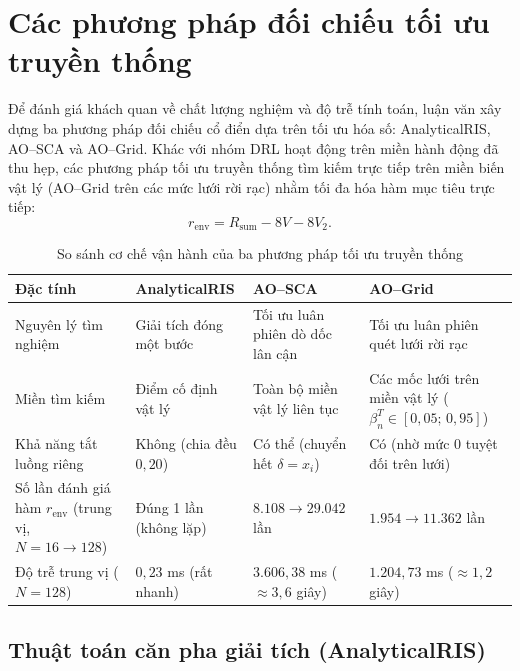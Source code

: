 

\section{Các phương pháp đối chiếu tối ưu truyền thống}
\label{sec:doi-chieu-ao}

Để đánh giá khách quan về chất lượng nghiệm và độ trễ tính toán, luận văn xây dựng ba phương pháp đối chiếu cổ
điển dựa trên tối ưu hóa số: AnalyticalRIS, AO--SCA và AO--Grid. Khác với nhóm DRL hoạt động trên miền hành động
đã thu hẹp, các phương pháp tối ưu truyền thống tìm kiếm trực tiếp trên miền biến vật lý (AO--Grid trên các mức
lưới rời rạc) nhằm tối đa hóa hàm mục tiêu trực tiếp:
\begin{equation}
r_{\mathrm{env}} = R_{\mathrm{sum}} - 8V - 8V_2 .
\label{eq:phan-thuong-moi-truong}
\end{equation}

\begin{table}[htbp]
\centering
\caption{So sánh cơ chế vận hành của ba phương pháp tối ưu truyền thống}
\label{tab:ch3-so-sanh-ao}
\footnotesize
\begin{tabularx}{\textwidth}{@{}l Y Y Y@{}}
\toprule
\textbf{Đặc tính} & \textbf{AnalyticalRIS} & \textbf{AO--SCA} & \textbf{AO--Grid} \\
\midrule
Nguyên lý tìm nghiệm & Giải tích đóng một bước & Tối ưu luân phiên dò dốc lân cận & Tối ưu luân phiên quét
lưới rời rạc \\
Miền tìm kiếm & Điểm cố định vật lý & Toàn bộ miền vật lý liên tục & Các mốc lưới trên miền vật lý
($\beta^T_n \in [0,05;\,0,95]$) \\
Khả năng tắt luồng riêng & Không (chia đều $0,20$) & Có thể (chuyển hết $\delta = x_i$) & Có (nhờ mức $0$
tuyệt đối trên lưới) \\
Số lần đánh giá hàm $r_{\mathrm{env}}$ (trung vị, $N = 16 \to 128$) & Đúng 1 lần (không lặp) &
$8.108 \to 29.042$ lần & $1.954 \to 11.362$ lần \\
Độ trễ trung vị ($N = 128$) & $0,23$ ms (rất nhanh) & $3.606,38$ ms ($\approx 3,6$ giây) & $1.204,73$ ms
($\approx 1,2$ giây) \\
\bottomrule
\end{tabularx}
\end{table}

\subsection{Thuật toán căn pha giải tích (AnalyticalRIS)}
\label{ssec:analytical-ris}

